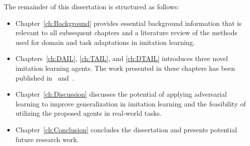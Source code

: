 The remainder of this dissertation is structured as follows:

\begin{itemize}
  \item
        Chapter~\ref{ch:Background} provides essential background information that is relevant to all subsequent chapters and a literature review of the methods used for domain and task adaptations in imitation learning.

  \item
        Chapters~\ref{ch:DAIL},
        \ref{ch:TAIL},
        and \ref{ch:DTAIL} introduces three novel imitation learning agents.
        The work presented in these chapters has been published in~\cite{Mine_DAIL} and~\cite{Mine_DTAIL}.

  \item Chapter~\ref{ch:Discussion} discusses the potential of applying adversarial learning to improve generalization in imitation learning and the feasibility of utilizing the proposed agents in real-world tasks.

  \item Chapter~\ref{ch:Conclusion} concludes the dissertation and presents potential future research work.
\end{itemize}
